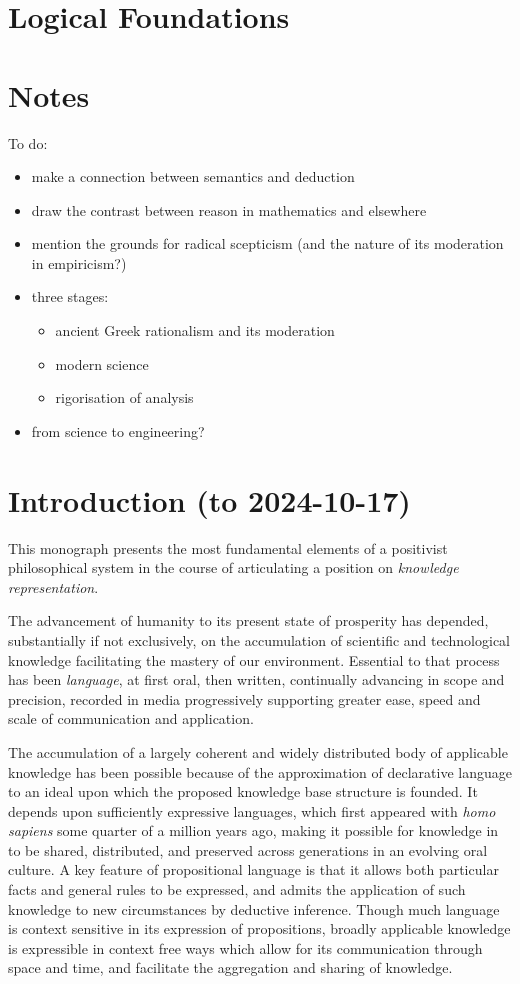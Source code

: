 \section{Logical Foundations}

\section{Notes}

To do:
\begin{itemize}
\item make a connection between semantics and deduction
\item draw the contrast between reason in mathematics and elsewhere
  \item mention the grounds for radical scepticism (and the nature of its moderation in empiricism?)
  \item three stages:
    \begin{itemize}
      \item
        ancient Greek rationalism and its moderation
      \item modern science
      \item rigorisation of analysis
    \end{itemize}
    \item from science to engineering?
\end{itemize}

\section{Introduction (to 2024-10-17)}

This monograph presents the most fundamental elements of a positivist philosophical system in the course of articulating a position on \emph{knowledge representation}.

The advancement of humanity to its present state of prosperity has depended, substantially if not exclusively, on the accumulation of scientific and technological knowledge facilitating the mastery of our environment.
Essential to that process has been \emph{language}, at first oral, then written, continually advancing in scope and precision, recorded in media progressively supporting greater ease, speed and scale of communication and application.

The accumulation of a largely coherent and widely distributed body of applicable knowledge has been possible because of the approximation of declarative language to an ideal upon which the proposed knowledge base structure is founded.
It depends upon sufficiently expressive languages, which first appeared with \emph{homo sapiens} some quarter of a million years ago, making it possible for knowledge in to be shared, distributed, and preserved across generations in an evolving oral culture.
A key feature of propositional language is that it allows both particular facts and general rules to be expressed, and admits the application of such knowledge to new circumstances by deductive inference.
Though much language is context sensitive in its expression of propositions, broadly applicable knowledge is expressible in context free ways which allow for its communication through space and time, and facilitate the aggregation and sharing of knowledge.

